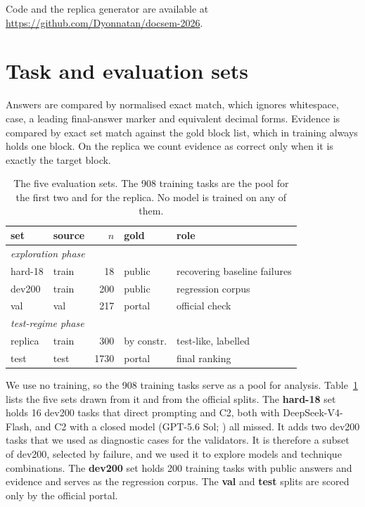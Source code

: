 \documentclass[11pt]{article}%
\begin{document}
Code and the replica generator are available at
\url{https://github.com/Dyonnatan/docsem-2026}.

\section{Task and evaluation sets}
\label{sec:data}

Answers are compared by normalised exact match, which ignores whitespace,
case, a leading final-answer marker and equivalent decimal forms. Evidence is
compared by exact set match against the gold block list, which in training
always holds one block. On the replica we count evidence as correct only when
it is exactly the target block.

\begin{table}[t]
\centering
\small
\setlength{\tabcolsep}{3pt}
\begin{tabularx}{\columnwidth}{llrl>{\raggedright\arraybackslash}X}
\toprule
set & source & $n$ & gold & role \\
\midrule
\multicolumn{5}{l}{\emph{exploration phase}} \\
hard-18   & train & 18   & public & recovering baseline failures \\
dev200    & train & 200  & public & regression corpus \\
val       & val   & 217  & portal & official check \\
\midrule
\multicolumn{5}{l}{\emph{test-regime phase}} \\
replica   & train & 300  & by constr. & test-like, labelled \\
test      & test  & 1730 & portal & final ranking \\
\bottomrule
\end{tabularx}
\caption{The five evaluation sets. The 908 training tasks are the pool for the
first two and for the replica. No model is trained on any of them.}
\label{tab:sets}
\end{table}

We use no training, so the 908 training tasks serve as a pool for analysis.
Table~\ref{tab:sets} lists the five sets drawn from it and from the official
splits. The \textbf{hard-18} set holds 16 dev200 tasks that direct prompting
and \textsc{C2}, both with DeepSeek-V4-Flash, and \textsc{C2} with a closed
model (GPT-5.6 Sol; \citealp{openai2026gpt56}) all missed. It adds two dev200 tasks that we used as
diagnostic cases for the validators. It is therefore a subset of dev200,
selected by failure, and we used it to explore models and technique
combinations. The \textbf{dev200} set holds 200 training tasks with public
answers and evidence and serves as the regression corpus. The \textbf{val} and
\textbf{test} splits are scored only by the official portal.
\end{document}
